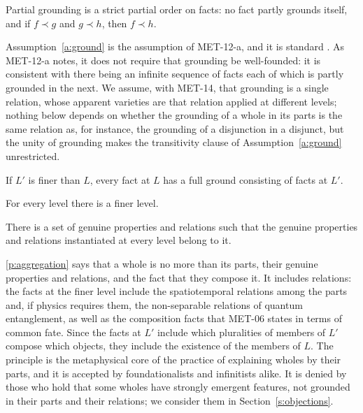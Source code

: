 \documentclass{situationist-preprint}
\begin{document}
\begin{assumption}[Grounding]\label{a:ground}
Partial grounding is a strict partial order on facts: no fact partly grounds itself, and if $f \prec g$ and $g \prec h$, then $f \prec h$.
\end{assumption}

Assumption~\ref{a:ground} is the assumption of MET-12-a, and it is standard \citep{Fine2012,Rosen2010,Schaffer2009}. As MET-12-a notes, it does not require that grounding be well-founded: it is consistent with there being an infinite sequence of facts each of which is partly grounded in the next. We assume, with MET-14, that grounding is a single relation, whose apparent varieties are that relation applied at different levels; nothing below depends on whether the grounding of a whole in its parts is the same relation as, for instance, the grounding of a disjunction in a disjunct, but the unity of grounding makes the transitivity clause of Assumption~\ref{a:ground} unrestricted.

\begin{principle}[Aggregation]\label{p:aggregation}
If $L'$ is finer than $L$, every fact at $L$ has a full ground consisting of facts at $L'$.
\end{principle}

\begin{principle}[Divisibility]\label{p:divisibility}
For every level there is a finer level.
\end{principle}

\begin{principle}\label{p:stock}
There is a set of genuine properties and relations such that the genuine properties and relations instantiated at every level belong to it.
\end{principle}

\ref{p:aggregation} says that a whole is no more than its parts, their genuine properties and relations, and the fact that they compose it. It includes relations: the facts at the finer level include the spatiotemporal relations among the parts and, if physics requires them, the non-separable relations of quantum entanglement, as well as the composition facts that MET-06 states in terms of common fate. Since the facts at $L'$ include which pluralities of members of $L'$ compose which objects, they include the existence of the members of $L$. The principle is the metaphysical core of the practice of explaining wholes by their parts, and it is accepted by foundationalists and infinitists alike. It is denied by those who hold that some wholes have strongly emergent features, not grounded in their parts and their relations; we consider them in Section~\ref{s:objections}.
\end{document}
